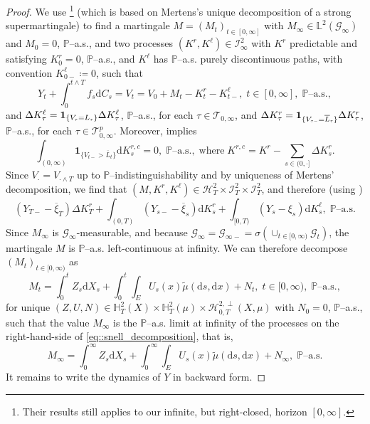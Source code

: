 \documentclass[10pt]{article} %
\newcommand\cG{\mathcal G}
\newcommand\cH{\mathcal H}
\newcommand\cI{\mathcal I}
\newcommand\cT{\mathcal T}
\newcommand{\smalltext}[1]{\text{\fontsize{4}{4}\selectfont$#1$}}
\def \H{\mathbb{H}}
\def \L{\mathbb{L}}
\def \P{\mathbb{P}}
\newcommand{\1}{\mathbf{1}}
\def\d{\mathrm{d}}
\begin{document}
\begin{proof}
	We use \cite[Lemma 3.2]{grigorova2020optimal}\footnote{Their results still applies to our infinite, but right-closed, horizon $[0,\infty]$.} (which is based on Mertens's unique decomposition of a strong supermartingale)  to find a martingale $M = (M_t)_{t \in [0,\infty]}$ with $M_\infty \in \L^2(\cG_\infty)$ and $M_0 = 0$, $\P$--a.s., and two processes $(K^r,K^\ell) \in \cI^2_\infty$ with $K^r$ predictable and satisfying $K^r_0 = 0$, $\P$--a.s., and $K^\ell$ has $\P$--a.s. purely discontinuous paths, with convention $K^\ell_{0-} \coloneqq 0$, such that
	\begin{equation*}
		Y_t + \int_0^{t \land T} f_s \d C_s = V_t = V_0  + M_t - K^r_t - K^\ell_{t-}, \; t \in [0,\infty], \; \text{$\P$--a.s.},
	\end{equation*}
	and $\Delta K^\ell_\tau = \mathbf{1}_{\{V_\smalltext{\tau} = L_\smalltext{\tau}\}} \Delta K^\ell_\tau$, $\P$--a.s., for each $\tau \in \cT_{0,\infty}$, and $\Delta K^r_\tau = \mathbf{1}_{\{V_{\smalltext{\tau}\smalltext{-}} = \overline L_\smalltext{\tau}\}} \Delta K^r_\tau$, $\P$--a.s., for each $\tau \in \cT^p_{0,\infty}$. Moreover, \cite[Lemma 3.3]{grigorova2020optimal} implies
	\begin{equation*}
		\int_{(0,\infty)} \mathbf{1}_{\{V_{t-} > \overline L_t\}} \d K^{r,c}_s = 0, \; \text{$\P$--a.s.}, \; \text{where} \; K^{r,c} = K^r - \sum_{s \in (0,\cdot]} \Delta K^r_s.
	\end{equation*}
	Since $V_\cdot = V_{\cdot \land T}$ up to $\P$--indistinguishability and by uniqueness of Mertens' decomposition, we find that $(M,K^r,K^\ell) \in \cH^2_T \times \cI^2_T \times \cI^2_T$, and therefore (using )
	\begin{equation*}
		(Y_{T-} - \overline\xi_T)\Delta K^r_T + \int_{(0,T)} (Y_{s-} - \overline\xi_s) \d K^r_s + \int_{[0,T)} (Y_s - \xi_s) \d K^\ell_s, \; \text{$\P$--a.s.}
	\end{equation*}
	Since $M_\infty$ is $\cG_\infty$-measurable, and because $\cG_\infty = \cG_{\infty-} = \sigma(\cup_{t \in [0,\infty)}\cG_t)$, the martingale $M$ is $\P$--a.s. left-continuous at infinity. We can therefore decompose $(M_t)_{t \in [0,\infty)}$ as
	\begin{equation}\label{eq::snell_decomposition}
		M_t = \int_0^t Z_s \d X_s + \int_0^t\int_E U_s(x)\tilde\mu(\d s, \d x) + N_t, \; t \in [0,\infty), \; \text{$\P$--a.s.},
	\end{equation}
	for unique $(Z,U,N) \in \H^2_T(X) \times \H^2_T(\mu) \times \cH^{2,\perp}_{0,T}(X,\mu)$ with $N_0 = 0$, $\P$--a.s., such that the value $M_\infty$ is the $\P$--a.s. limit at infinity of the processes on the right-hand-side of \eqref{eq::snell_decomposition}, that is,
	\begin{equation*}
		M_\infty = \int_0^{\infty} Z_s \d X_s + \int_0^{\infty}\int_E U_s(x)\tilde\mu(\d s, \d x) + N_\infty, \; \text{$\P$--a.s.}
	\end{equation*}
	It remains to write the dynamics of $Y$ in backward form.
	

\end{proof}
\end{document}
